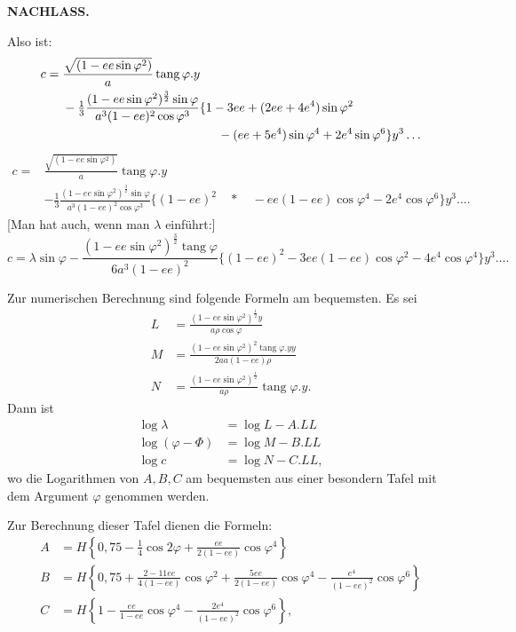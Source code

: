 \par\clearpage
{}\hfill{\small\textbf{NACHLASS.}}\hfill\null\par\medskip
Also ist:
\[
\begin{aligned}
c={}&\frac{\sqrt{(1-ee\sin\varphi^2)}}a\operatorname{tang}\varphi.y\\
&-\tfrac13\frac{(1-ee\sin\varphi^2)^{\frac32}\sin\varphi}{a^3(1-ee)^2\cos\varphi^3}\{1-3ee+(2ee+4e^4)\sin\varphi^2\\
&\hspace{44mm}-(ee+5e^4)\sin\varphi^4+2e^4\sin\varphi^6\}y^3\ldots
\end{aligned}
\]
\noindent[oder]
\[
\begin{aligned}
c={}&\frac{\sqrt{(1-ee\sin\varphi^2)}}a\operatorname{tang}\varphi.y\\
&-\tfrac13\frac{(1-ee\sin\varphi^2)^{\frac32}\sin\varphi}{a^3(1-ee)^2\cos\varphi^3}\{(1-ee)^2\quad *\quad-ee(1-ee)\cos\varphi^4-2e^4\cos\varphi^6\}y^3\ldots.
\end{aligned}
\]
[Man hat auch, wenn man \(\lambda\) einführt:]
\[c=\lambda\sin\varphi-\frac{(1-ee\sin\varphi^2)^{\frac32}\operatorname{tang}\varphi}{6a^3(1-ee)^2}\{(1-ee)^2-3ee(1-ee)\cos\varphi^2-4e^4\cos\varphi^4\}y^3\ldots.\]
\medskip
{\centering [3.]\par}
Zur numerischen Berechnung sind folgende Formeln am bequemsten. Es sei
\[
\begin{aligned}
L&=\frac{(1-ee\sin\varphi^2)^{\frac12}y}{a\rho\cos\varphi}\\
M&=\frac{(1-ee\sin\varphi^2)^2\operatorname{tang}\varphi.yy}{2aa(1-ee)\rho}\\
N&=\frac{(1-ee\sin\varphi^2)^{\frac12}}{a\rho}\operatorname{tang}\varphi.y.
\end{aligned}
\]
Dann ist
\[
\begin{aligned}
\log\lambda&=\log L-A.LL\\
\log(\varphi-\Phi)&=\log M-B.LL\\
\log c&=\log N-C.LL,
\end{aligned}
\]
\noindent wo die Logarithmen von \(A,B,C\) am bequemsten aus einer besondern Tafel mit dem Argument \(\varphi\) genommen werden.

Zur Berechnung dieser Tafel dienen die Formeln:
\[
\begin{aligned}
A&=H\left\{0{,}75-\tfrac14\cos2\varphi+\frac{ee}{2(1-ee)}\cos\varphi^4\right\}\\
B&=H\left\{0{,}75+\frac{2-11ee}{4(1-ee)}\cos\varphi^2+\frac{5ee}{2(1-ee)}\cos\varphi^4-\frac{e^4}{(1-ee)^2}\cos\varphi^6\right\}\\
C&=H\left\{1-\frac{ee}{1-ee}\cos\varphi^4-\frac{2e^4}{(1-ee)^2}\cos\varphi^6\right\},
\end{aligned}
\]

